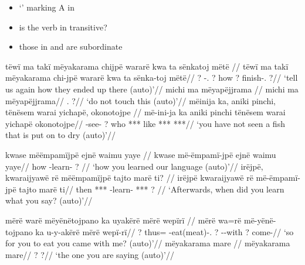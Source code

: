 \documentclass{memoir}
\begin{document}
\begin{itemize}
\tightlist
\item
   `' marking A in 
\item
  is the verb in  transitive?
\item
  those in  and  are subordinate
\end{itemize}

\pex\label{2a}    \a     \label{convhistfamsjm-13}        \begingl
        \glpreamble tëwï ma takï mëyakarama chijpë wararë kwa ta sënkatoj mëtë //
        \gla tëwï ma takï mëyakarama chi-jpë wararë kwa ta sënka-toj mëtë//
        \glb {}   ? -. ? how ? finish-. ?//
            \glft ‘tell us again how they ended up there (auto)’//  
        \endgl 
    \a     \label{ctovarmafl-324}        \begingl
        \glpreamble michi ma mëyapëjjrama //
        \gla michi ma mëyapëjjrama//
        \glb {}.  ?//
            \glft ‘do not touch this (auto)’//  
        \endgl 
    \a     \label{histyarirdi-633}        \begingl
        \glpreamble mëinija ka, aniki pinchi, tënësem warai yichapë, okonotojpe //
        \gla më-ini-ja ka aniki pinchi tënësem warai yichapë okonotojpe//
        \glb {}-see- ? who  *** like *** ***//
            \glft ‘you have not seen a fish that is put on to dry (auto)’//  
        \endgl 
\xe

\pex\label{learn}    \a     \label{convhistfamsjm-15}        \begingl
        \glpreamble kwase mëëmpamïjpë ejnë waimu yaye //
        \gla kwase më-ëmpamï-jpë ejnë waimu yaye//
        \glb how -learn-  ? //
            \glft ‘how you learned our language (auto)’//  
        \endgl 
    \a     \label{convhistfamsjm-238}        \begingl
        \glpreamble irëjpë, kwaraijyawë rë mëëmpamïjpë tajto marë ti? //
        \gla irëjpë kwaraijyawë rë më-ëmpamï-jpë tajto marë ti//
        \glb then ***  -learn- *** ? //
            \glft ‘Afterwards, when did you learn what you say? (auto)’//  
        \endgl 
\xe

\pex\label{2sub}    \a     \label{convfemgrme-43}        \begingl
        \glpreamble mërë warë mëyënëtojpano ka uyakërë mërë wepïrï //
        \gla mërë wa=rë më-yënë-tojpano ka u-y-akërë mërë wepï-rï//
        \glb ? thus= -eat(meat)-. ? --with ? come-//
            \glft ‘so for you to eat you came with me? (auto)’//  
        \endgl 
    \a     \label{ctoaragrme-5}        \begingl
        \glpreamble mëyakarama mare //
        \gla mëyakarama mare//
        \glb ? ?//
            \glft ‘the one you are saying (auto)’//  
        \endgl 
\xe
\end{document}
